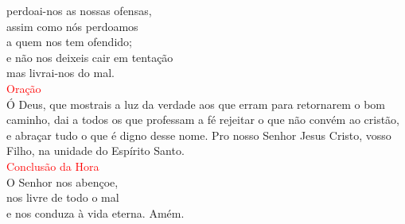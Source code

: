 \documentclass{book}
\begin{document}
\begin{center}
    perdoai-nos as nossas ofensas, \\
    assim como nós perdoamos \\
    a quem nos tem ofendido; \\
    e não nos deixeis cair em tentação \\
    mas livrai-nos do mal.
    \vspace{.2cm} \\
    \textcolor{red}{Oração}
    \vspace{.2cm} \\
    Ó Deus, que mostrais a luz da verdade aos que erram para retornarem o bom caminho, dai a todos os que professam a fé rejeitar o que não convém ao cristão, e abraçar tudo o que é digno desse nome. Pro nosso Senhor Jesus Cristo, vosso Filho, na unidade do Espírito Santo.
    \vspace{.2cm} \\
    \textcolor{red}{Conclusão da Hora}
    \vspace{.2cm} \\
    O Senhor nos abençoe, \\
    nos livre de todo o mal \\
    e nos conduza à vida eterna. Amém.
\end{center}
\end{document}
